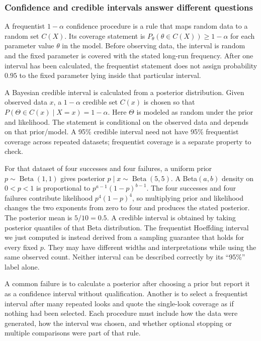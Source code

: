 \subsubsection{Confidence and credible intervals answer different questions}\label{02-foundations-ii-ch029-confidence-and-credible-intervals-answer-different-questions}

\hypertarget{02-foundations-ii-ch029-confidence-and-credible-intervals-answer-different-questions}{}

A frequentist \(1-\alpha\) confidence procedure is a rule that maps random data to a random set \(C(X)\). Its coverage statement is \(P_\theta(\theta\in C(X))\ge1-\alpha\) for each parameter value \(\theta\) in the model. Before observing data, the interval is random and the fixed parameter is covered with the stated long-run frequency. After one interval has been calculated, the frequentist statement does not assign probability \(0.95\) to the fixed parameter lying inside that particular interval.

A Bayesian credible interval is calculated from a posterior distribution. Given observed data \(x\), a \(1-\alpha\) credible set \(C(x)\) is chosen so that \(P(\Theta\in C(x)\mid X=x)=1-\alpha\). Here \(\Theta\) is modeled as random under the prior and likelihood. The statement is conditional on the observed data and depends on that prior/model. A 95\% credible interval need not have 95\% frequentist coverage across repeated datasets; frequentist coverage is a separate property to check.

For that dataset of four successes and four failures, a uniform prior \(p\sim\operatorname{Beta}(1,1)\) gives posterior \(p\mid x\sim\operatorname{Beta}(5,5)\). A Beta\((a,b)\) density on \(0<p<1\) is proportional to \(p^{a-1}(1-p)^{b-1}\). The four successes and four failures contribute likelihood \(p^4(1-p)^4\), so multiplying prior and likelihood changes the two exponents from zero to four and produces the stated posterior. The posterior mean is \(5/10=0.5\). A credible interval is obtained by taking posterior quantiles of that Beta distribution. The frequentist Hoeffding interval we just computed is instead derived from a sampling guarantee that holds for every fixed \(p\). They may have different widths and interpretations while using the same observed count. Neither interval can be described correctly by its ``95\%'' label alone.

A common failure is to calculate a posterior after choosing a prior but report it as a confidence interval without qualification. Another is to select a frequentist interval after many repeated looks and quote the single-look coverage as if nothing had been selected. Each procedure must include how the data were generated, how the interval was chosen, and whether optional stopping or multiple comparisons were part of that rule.

